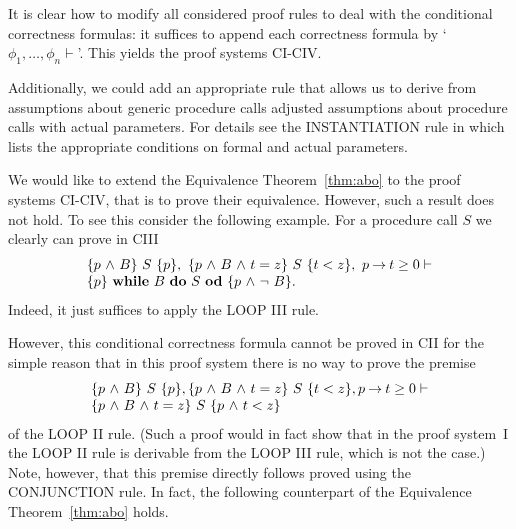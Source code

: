 \documentclass[runningheads]{llncs}       %
\begin{document}
It is clear how to modify all considered proof rules to deal with the
conditional correctness formulas: it suffices to append each
correctness formula by `$\phi_1, \dots, \phi_n \vdash$'.  This yields
the proof systems CI-CIV.







Additionally, we could add an appropriate rule that allows us to
derive from assumptions about generic procedure calls adjusted
assumptions about procedure calls with actual parameters.  For details
see the INSTANTIATION rule in \cite[page 159]{ABO09} which lists the
appropriate conditions on formal and actual parameters.

We would like to extend the Equivalence Theorem~\ref{thm:abo} to the
proof systems CI-CIV, that is to prove their equivalence.  However,
such a result does not hold.  To see this consider the following
example.  For a procedure call $S$ we clearly can prove in CIII
\[
  \begin{array}{l}
    \mbox{$\{{p \mbox{$\ \wedge\ $} B}\}\ {S}\ \{{p}\}$}, \ \mbox{$\{{p \mbox{$\ \wedge\ $} B \mbox{$\ \wedge\ $} t=z}\}\ {S}\ \{{t<z}\}$}, \ p \mbox{$\:\rightarrow\:$} t \geq 0 \vdash \\
    \mbox{$\{{p}\}\ {\mbox{$\mbox{{\bf while}\ } {B}\ \mbox{{\bf do}\ } {S}\ \mbox{{\bf od}}$}}\ \{{p \mbox{$\ \wedge\ $} \neg\ B}\}$}.
  \end{array}
\]
Indeed, it just suffices to apply the LOOP III rule.

However, this conditional correctness formula cannot be proved in CII
for the simple reason that in this proof system there is no way to
prove the premise
\[
  \begin{array}{l}  
    \mbox{$\{{p \mbox{$\ \wedge\ $} B}\}\ {S}\ \{{p}\}$}, \mbox{$\{{p \mbox{$\ \wedge\ $} B \mbox{$\ \wedge\ $} t=z}\}\ {S}\ \{{t<z}\}$}, p \mbox{$\:\rightarrow\:$} t \geq 0 \vdash  \\
    \mbox{$\{{p \mbox{$\ \wedge\ $} B \mbox{$\ \wedge\ $} t=z}\}\ {S}\ \{{p \mbox{$\ \wedge\ $} t<z}\}$}
  \end{array}    
\]
of the LOOP II rule. (Such a proof would in fact show that in the
proof system~I the LOOP II rule is derivable from the LOOP III rule,
which is not the case.)  Note, however, that this premise directly
follows proved using the CONJUNCTION rule.
In fact, the following counterpart of the Equivalence Theorem~\ref{thm:abo}
holds.
\end{document}
